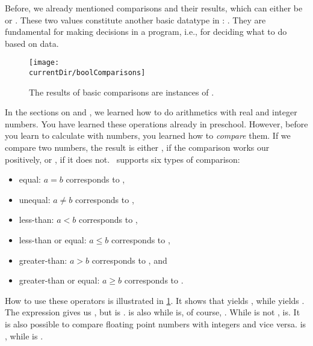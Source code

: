 %
\label{sec:bool}%
%
Before, we already mentioned comparisons and their results, which can either be  or .
These two values constitute another basic datatype in \python: .
They are fundamental for making decisions in a program, i.e., for deciding what to do based on data.
%
%
%
\begin{figure}%
\centering%
\texttt{[image: \\currentDir/boolComparisons]}%
\caption{The results of basic comparisons are instances of .}%
\label{fig:boolComparisons}%
\end{figure}%
%
In the sections on  and , we learned how to do arithmetics with real and integer numbers.
You have learned these operations already in preschool.
However, before you learn to calculate with numbers, you learned how to \emph{compare} them.
If we compare two numbers, the result is either , if the comparison works our positively, or , if it does not.
\python\ supports six types of comparison:%
%
\begin{itemize}%
%
\item equal: $a = b$ corresponds to \pythonIdx{==},%
\item unequal: $a \neq b$ corresponds to \pythonIdx{!=},%
\item less-than: $a < b$ corresponds to \pythonIdx{<},%
\item less-than or equal: $a \leq b$ corresponds to \pythonIdx{<=},%
\item greater-than: $a > b$ corresponds to \pythonIdx{>}, and%
\item greater-than or equal: $a \geq b$ corresponds to \pythonIdx{>=}.%
%
\end{itemize}%
%
How to use these operators is illustrated in \cref{fig:boolComparisons}.
It shows that \pythonIdx{==} yields , while \pythonIdx{!=} yields .
The expression \pythonIdx{>} gives us , but \pythonIdx{>=} is .
\pythonIdx{<} is also  while  is, of course, .
While \pythonIdx{>} is not , \pythonIdx{>} is.
It is also possible to compare floating point numbers with integers and vice versa.
\pythonIdx{==} is , while  is .

